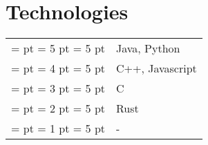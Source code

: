 \documentclass [a4paper,10pt]{article}
\newcommand{\gradelong}[6]{%
    \pgfmathtruncatemacro\floored{#1}%
    \pgfmathsetmacro\diff{#1-\floored}%
    \newdimen\diffDim%
    \diffDim = \diff pt%
    \newdimen\numPointsDim
    \numPointsDim = #1 pt
    \newdimen\maxPointsDim%
    \maxPointsDim = #2 pt%
    \begin{tikzpicture}
        \foreach \x in {1, ..., #2}{
            \ifnum \x > \floored \relax%
                \def\fillCol{#6}%
            \else%
                \def\fillCol{#5}%
            \fi%
            \fill[\fillCol] (#3*\x, 0) circle (#4);
        }%
        \ifdim \diffDim > 0 pt \relax%
            \ifdim \numPointsDim > \maxPointsDim \relax%
            \else%
                \pgfmathsetmacro\pos{#3*(\floored+1)}%
                \begin{scope}[xshift=\pos]
                    \clip (-#4,-#4) rectangle ++(#4*2*\diff,#4*2);
                    \fill[#5] (0, 0) circle (#4);
                \end{scope}
            \fi%
        \else%
        \fi%
    \end{tikzpicture}%
}
\newcommand{\grade}[1]{%
    \gradelong%
    {#1}%
    {5}%
    {9pt}%
    {3pt}%
    {frontColor}%
    {backColor}%
}
\begin{document}
\section{Technologies}
\begin{tabular}{r p{11cm}}
\\
        \grade{5}  & Java, Python\\
        \grade{4} & C++, Javascript \\
        \grade{3} & C\\
        \grade{2} & Rust\\
        \grade{1} & -\\
\end{tabular}
\end{document}
